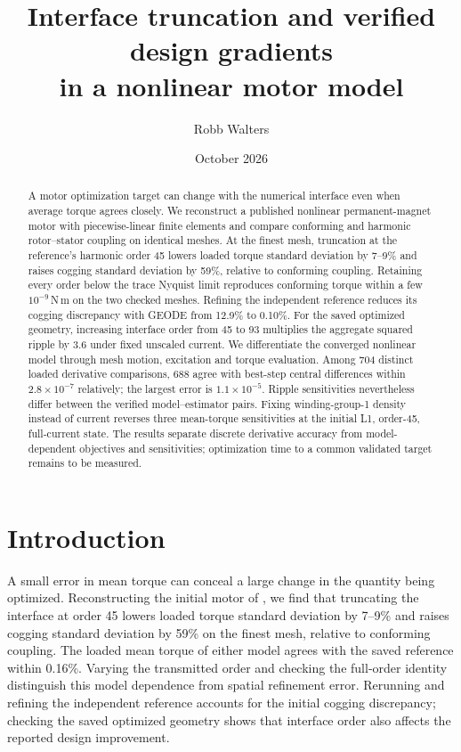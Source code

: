 \documentclass{anvil-paper}
\title{Interface truncation and verified design gradients\\
in a nonlinear motor model}
\author{Robb Walters}
\date{October 2026}
\begin{document}
\maketitle
\begin{abstract}
A motor optimization target can change with the numerical interface even
when average torque agrees closely. We reconstruct a published nonlinear
permanent-magnet motor with piecewise-linear finite elements and compare
conforming and harmonic rotor--stator coupling on identical meshes.
At the finest mesh, truncation at the reference's harmonic order 45 lowers
loaded torque standard deviation by 7--9\% and raises cogging standard
deviation by 59\%, relative to conforming coupling. Retaining every order
below the trace Nyquist limit reproduces conforming torque within a few
$10^{-9}$\,N\,m on the two checked meshes. Refining the independent reference
reduces its cogging discrepancy with GEODE from 12.9\% to 0.10\%.
For the saved optimized geometry, increasing interface order from 45 to 93
multiplies the aggregate squared ripple by 3.6 under fixed unscaled current. We differentiate the converged nonlinear model through
mesh motion, excitation and torque evaluation. Among 704 distinct loaded
derivative comparisons, 688 agree with best-step central differences within
$2.8\times10^{-7}$ relatively; the largest error is $1.1\times10^{-5}$.
Ripple sensitivities nevertheless differ between the verified
model--estimator pairs. Fixing winding-group-1 density instead of current
reverses three mean-torque sensitivities at the initial L1, order-45,
full-current state.
The results separate discrete derivative accuracy from model-dependent
objectives and sensitivities; optimization time to a common validated
target remains to be measured.

\end{abstract}

\section{Introduction}
A small error in mean torque can conceal a large change in the quantity
being optimized. Reconstructing the initial motor of
\citet{wiesheu2024spline}, we find that truncating the interface at order 45
lowers loaded torque standard deviation by 7--9\% and raises cogging
standard deviation by 59\% on the finest mesh, relative to conforming coupling. The loaded
mean torque of either model agrees with the saved reference within 0.16\%.
Varying the transmitted order and checking the full-order identity
distinguish this model dependence from spatial refinement error. Rerunning
and refining the independent reference accounts for the initial cogging
discrepancy; checking the saved optimized geometry shows that interface
order also affects the reported design improvement.
\end{document}
